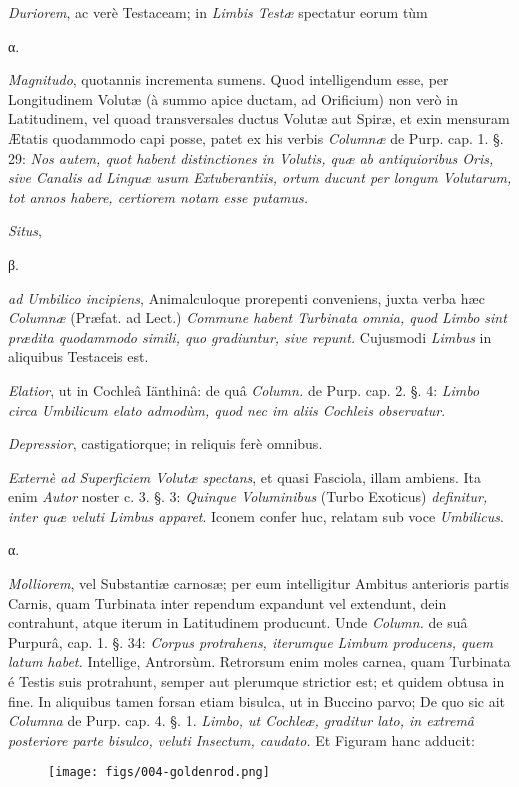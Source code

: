\documentclass[a4paper, 11pt, oneside, polutonikogreek, german]{article}
\begin{document}
\emph{Duriorem}, ac verè Testaceam; in \emph{Limbis Testæ} spectatur eorum tùm

α.

\emph{Magnitudo}, quotannis incrementa sumens. Quod intelligendum esse, per Longitudinem Volutæ (à summo apice ductam, ad Orificium) non verò in Latitudinem, vel quoad transversales ductus Volutæ aut Spiræ, et exin mensuram Ætatis quodammodo capi posse, patet ex his verbis \emph{Columnæ} de Purp. cap. 1. §. 29: \emph{Nos autem, quot habent distinctiones in Volutis, quæ ab antiquioribus Oris, sive Canalis ad Linguæ usum Extuberantiis, ortum ducunt per longum Volutarum, tot annos habere, certiorem notam esse putamus.}

\emph{Situs},

β.

\emph{ad Umbilico incipiens}, Animalculoque prorepenti conveniens, juxta verba hæc \emph{Columnæ} (Præfat. ad Lect.) \emph{Commune habent Turbinata omnia, quod Limbo sint prædita quodammodo simili, quo gradiuntur, sive repunt.} Cujusmodi \emph{Limbus} in aliquibus Testaceis est.

\emph{Elatior}, ut in Cochleâ Iänthinâ: de quâ \emph{Column.} de Purp. cap. 2. §. 4: \emph{Limbo circa Umbilicum elato admodùm, quod nec im aliis Cochleis observatur}.

\emph{Depressior}, castigatiorque; in reliquis ferè omnibus.

\emph{Externè ad Superficiem Volutæ spectans}, et quasi Fasciola, illam ambiens. Ita enim \emph{Autor} noster c. 3. §. 3: \emph{Quinque Voluminibus} (Turbo Exoticus) \emph{definitur, inter quæ veluti Limbus apparet}. Iconem confer huc, relatam sub voce \emph{Umbilicus}.

α.

\emph{Molliorem}, vel Substantiæ carnosæ; per eum intelligitur Ambitus anterioris partis Carnis, quam Turbinata inter rependum expandunt vel extendunt, dein contrahunt, atque iterum in Latitudinem producunt. Unde \emph{Column.} de suâ Purpurâ, cap. 1. §. 34: \emph{Corpus protrahens, iterumque Limbum producens, quem latum habet.} Intellige, Antrorsùm. Retrorsum enim moles carnea, quam Turbinata é Testis suis protrahunt, semper aut plerumque strictior est; et quidem obtusa in fine. In aliquibus tamen forsan etiam bisulca, ut in Buccino parvo; De quo sic ait \emph{Columna} de Purp. cap. 4. §. 1. \emph{Limbo, ut Cochleæ, graditur lato, in extremâ posteriore parte bisulco, veluti Insectum, caudato.} Et Figuram hanc adducit:

\begin{figure}[H]
\centering
\texttt{[image: figs/004-goldenrod.png]}
\end{figure}
\end{document}
